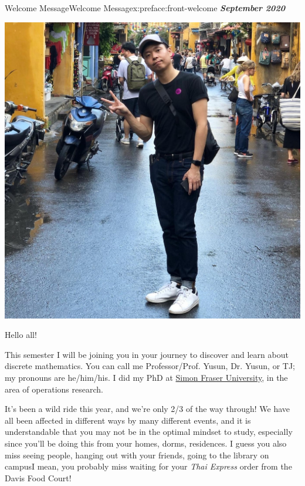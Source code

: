 \documentclass[oneside,10pt,]{book}
\newcommand{\alert}[1]{\textbf{\textit{#1}}}
\numberwithin{equation}{section}
\begin{document}
\par\medskip
{}
\null\clearpage
%
%
\typeout{************************************************}
\typeout{************************************************}
%
\begin{preface}{Welcome Message}{}{Welcome Message}{}{}{x:preface:front-welcome}
\alert{September 2020}%
\begin{sidebyside}{1}{0.15}{0.15}{0}%
\begin{sbspanel}{0.7}%
\includegraphics[width=\linewidth]{figs/TJ.jpg}
\end{sbspanel}%
\end{sidebyside}%
\par
Hello all!%
\par
This semester I will be joining you in your journey to discover and learn about discrete mathematics. You can call me Professor\slash{}Prof. Yusun, Dr. Yusun, or TJ; my pronouns are he\slash{}him\slash{}his. I did my PhD at \href{https://sfu.ca}{Simon Fraser University}, in the area of operations research.%
\par
It's been a wild ride this year, and we're only 2\slash{}3 of the way through! We have all been affected in different ways by many different events, and it is understandable that you may not be in the optimal mindset to study, especially since you'll be doing this from your homes, dorms, residences. I guess you also miss seeing people, hanging out with your friends, going to the library on campus\textellipsis{}I mean, you probably miss waiting for your \emph{Thai Express} order from the Davis Food Court!%

\end{preface}
\end{document}
